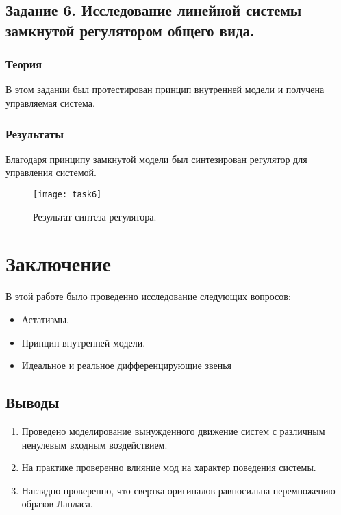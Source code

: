 \documentclass[16pt]{article}
\begin{document}
\subsection{Задание 6. Исследование линейной системы замкнутой регулятором общего вида.}

\subsubsection{Теория}
В этом задании был протестирован принцип внутренней модели и получена управляемая система.
\subsubsection{Результаты}
Благодаря принципу замкнутой модели был синтезирован регулятор для управления системой.
\begin{figure}[h!]
    \centering
    \texttt{[image: task6]}
    \caption{Результат синтеза регулятора.}
    \label{fig:fig13}
\end{figure}

\pagebreak
\pagebreak
\section{Заключение}
В этой работе было проведенно исследование следующих вопросов:
\begin{itemize}
    \item Астатизмы.
    \item Принцип внутренней модели.
    \item Идеальное и реальное дифференцирующие звенья
\end{itemize} 
\subsection{Выводы}
\begin{enumerate}
   \item Проведено моделирование вынужденного движение систем с различным ненулевым входным воздействием.
   \item На практике проверенно влияние мод на характер поведения системы.
   \item Наглядно проверенно, что свертка оригиналов равносильна перемножению образов Лапласа.
\end{enumerate}
\end{document}
